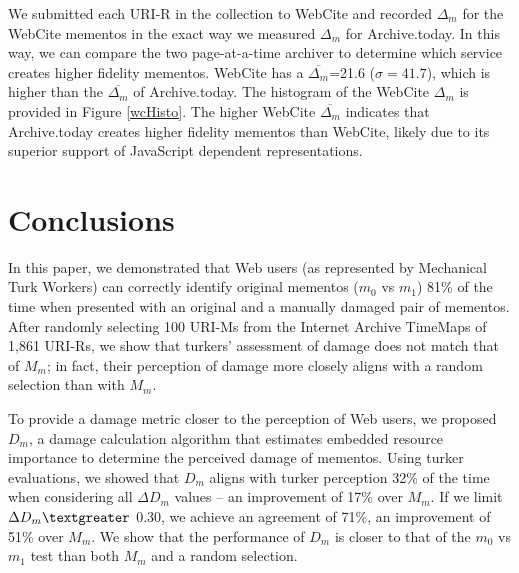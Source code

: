 
We submitted each URI-R in the collection to WebCite and recorded $\Delta_m$ for the WebCite mementos in the exact way we measured $\Delta_m$ for Archive.today. In this way, we can compare the two page-at-a-time archiver to determine which service creates higher fidelity mementos. WebCite has a $\overline{\Delta_m}$=21.6 ($\sigma=41.7$), which is higher than the $\overline{\Delta_m}$ of Archive.today. The histogram of the WebCite $\Delta_m$ is provided in Figure \ref{wcHisto}. The higher WebCite $\overline{\Delta_m}$ indicates that Archive.today creates higher fidelity mementos than WebCite, likely due to its superior support of JavaScript dependent representations.



\section{Conclusions}
\label{conclusion}
In this paper, we demonstrated that Web users (as represented by Mechanical Turk Workers) can correctly identify original mementos ($m_0$ vs $m_1$) 81\% of the time when presented with an original and a manually damaged pair of mementos. After randomly selecting 100 URI-Ms from the Internet Archive TimeMaps of 1,861 URI-Rs, we show that turkers' assessment of damage does not match that of $M_m$; in fact, their perception of damage more closely aligns with a random selection than with $M_m$. 

To provide a damage metric closer to the perception of Web users, we proposed $D_m$, a damage calculation algorithm that estimates embedded resource importance to determine the perceived damage of mementos. Using turker evaluations, we showed that $D_m$ aligns with turker perception 32\% of the time when considering all {$\Delta D_m$} values -- an improvement of 17\% over $M_m$. If we limit {$\Delta D_m \textgreater$} 0.30, we achieve an agreement of 71\%, an improvement of 51\% over $M_m$. We show that the performance of $D_m$ is closer to that of the $m_0$ vs $m_1$ test than both $M_m$ and a random selection.

